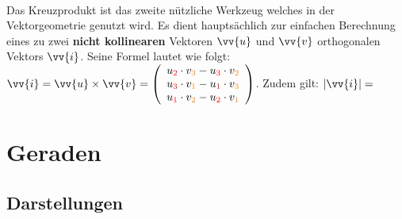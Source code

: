     \paragraph{} Das Kreuzprodukt ist das zweite nützliche Werkzeug welches in der Vektorgeometrie genutzt wird. Es dient hauptsächlich zur einfachen Berechnung
    eines zu zwei \textbf{nicht kollinearen} Vektoren $\vv{u}$ und $\vv{v}$ orthogonalen Vektors $\vv{i}$. Seine Formel lautet wie folgt:
    $\vv{i} = \vv{u} \times \vv{v} = \left(\begin{array}{c} u_{\textcolor{red}{2}} \cdot v_{\textcolor{orange}{3}} - u_{\textcolor{red}{3}} \cdot v_{\textcolor{orange}{2}} \\ u_{\textcolor{red}{3}} \cdot v_{\textcolor{orange}{1}} - u_{\textcolor{red}{1}} \cdot v_{\textcolor{orange}{3}} \\ u_{\textcolor{red}{1}} \cdot v_{\textcolor{orange}{2}} - u_{\textcolor{red}{2}} \cdot v_{\textcolor{orange}{1}} \end{array}\right)$.
    Zudem gilt: $|\vv{i}| = $

    \begin{Beweis}

    \end{Beweis}


\section{Geraden}

    \subsection{Darstellungen}

